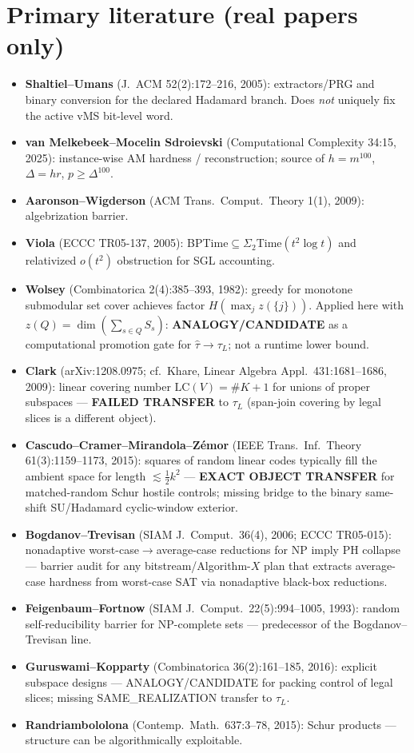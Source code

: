 \documentclass[11pt]{article}
\begin{document}
\section*{Primary literature (real papers only)}
\begin{itemize}
\item \textbf{Shaltiel--Umans} (J.~ACM 52(2):172--216, 2005): extractors/PRG and binary conversion
for the declared Hadamard branch. Does \emph{not} uniquely fix the active vMS bit-level word.
\item \textbf{van Melkebeek--Mocelin Sdroievski} (Computational Complexity 34:15, 2025): instance-wise
AM hardness / reconstruction; source of $h=m^{100}$, $\Delta=hr$, $p\ge\Delta^{100}$.
\item \textbf{Aaronson--Wigderson} (ACM Trans.\ Comput.\ Theory 1(1), 2009): algebrization barrier.
\item \textbf{Viola} (ECCC TR05-137, 2005): BPTime$\subseteq\Sigma_2$Time$(t^2\log t)$ and relativized
$o(t^2)$ obstruction for SGL accounting.
\item \textbf{Wolsey} (Combinatorica 2(4):385--393, 1982): greedy for monotone submodular set cover
achieves factor $H(\max_j z(\{j\}))$. Applied here with $z(Q)=\dim(\sum_{s\in Q}S_s)$:
\textbf{ANALOGY/CANDIDATE} as a computational promotion gate for $\widehat\tau\to\tau_L$;
not a runtime lower bound.
\item \textbf{Clark} (arXiv:1208.0975; cf.\ Khare, Linear Algebra Appl.\ 431:1681--1686, 2009):
linear covering number $\mathrm{LC}(V)=\#K+1$ for unions of proper subspaces ---
\textbf{FAILED TRANSFER} to $\tau_L$ (span-join covering by legal slices is a different object).
\item \textbf{Cascudo--Cramer--Mirandola--Z\'emor} (IEEE Trans.\ Inf.\ Theory 61(3):1159--1173, 2015):
squares of random linear codes typically fill the ambient space for length $\lesssim\tfrac12 k^2$ ---
\textbf{EXACT OBJECT TRANSFER} for matched-random Schur hostile controls; missing bridge to the
binary same-shift SU/Hadamard cyclic-window exterior.
\item \textbf{Bogdanov--Trevisan} (SIAM J.\ Comput.\ 36(4), 2006; ECCC TR05-015): nonadaptive
worst-case$\to$average-case reductions for NP imply PH collapse --- barrier audit for any
bitstream/Algorithm-$X$ plan that extracts average-case hardness from worst-case SAT via
nonadaptive black-box reductions.
\item \textbf{Feigenbaum--Fortnow} (SIAM J.\ Comput.\ 22(5):994--1005, 1993): random self-reducibility
barrier for NP-complete sets --- predecessor of the Bogdanov--Trevisan line.
\item \textbf{Guruswami--Kopparty} (Combinatorica 36(2):161--185, 2016): explicit subspace designs ---
ANALOGY/CANDIDATE for packing control of legal slices; missing SAME\_REALIZATION transfer to $\tau_L$.
\item \textbf{Randriambololona} (Contemp.\ Math.\ 637:3--78, 2015): Schur products --- structure can be
algorithmically exploitable.
\end{itemize}
\end{document}

